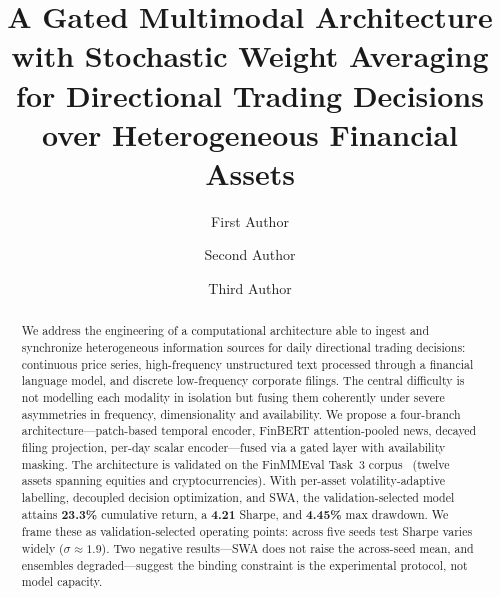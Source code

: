 \documentclass[runningheads]{llncs}
\begin{document}
\title{A Gated Multimodal Architecture with Stochastic Weight Averaging for
Directional Trading Decisions over Heterogeneous Financial Assets}


\author{First Author \and
Second Author \and
Third Author}



\maketitle

\begin{abstract}
We address the engineering of a computational architecture able to ingest and
synchronize heterogeneous information sources for daily directional trading
decisions: continuous price series, high-frequency unstructured text processed
through a financial language model, and discrete low-frequency corporate
filings. The central difficulty is not modelling each modality in isolation but
fusing them coherently under severe asymmetries in frequency, dimensionality and
availability. We propose a four-branch architecture---patch-based temporal encoder, FinBERT
attention-pooled news, decayed filing projection, per-day scalar
encoder---fused via a gated layer with availability masking. The architecture is validated on the FinMMEval
Task~3 corpus~\cite{qian2025agents} (twelve assets spanning equities and cryptocurrencies). With per-asset volatility-adaptive labelling, decoupled decision optimization,
and SWA, the validation-selected model attains \textbf{23.3\%} cumulative
return, a \textbf{4.21} Sharpe, and \textbf{4.45\%} max drawdown. We frame these as validation-selected operating points: across five seeds test
Sharpe varies widely ($\sigma \approx 1.9$). Two negative results---SWA does
not raise the across-seed mean, and ensembles degraded---suggest the binding
constraint is the experimental protocol, not model capacity.

\end{abstract}
\end{document}
